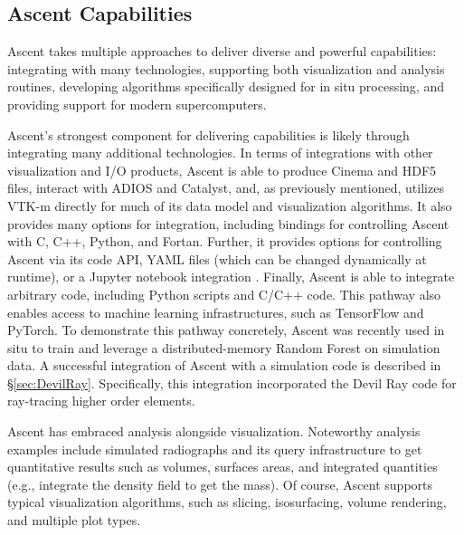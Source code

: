 \documentclass[graybox]{svmult}
\begin{document}
\subsection{Ascent Capabilities}
\label{subsec:capabilities}

Ascent takes multiple approaches to deliver diverse and powerful capabilities:
integrating with many technologies,
supporting both visualization and analysis routines,
developing algorithms specifically designed for in situ processing,
and providing support for modern supercomputers.

Ascent's strongest component for delivering capabilities is likely
through integrating many additional technologies.
%
In terms of integrations with other visualization and I/O products,
Ascent is able to produce Cinema and HDF5 files, interact with
ADIOS and Catalyst, and, as previously mentioned, utilizes VTK-m
directly for much of its data model and visualization algorithms.
%
It also provides many options for integration, including
bindings
for controlling Ascent with  C, C++, Python, and Fortan.
%
Further, it provides options for controlling Ascent via its code API,
YAML files (which can be changed dynamically at runtime), or
a Jupyter notebook integration \cite{CyrusISAV}.
%
Finally, Ascent is able to integrate arbitrary code, including
Python scripts and C/C++ code.
%
This pathway also enables access to
machine learning infrastructures, such as TensorFlow and PyTorch.
%
%
To demonstrate this pathway concretely, Ascent was recently used in situ
to train and leverage a distributed-memory Random Forest on simulation data.
%
%
A successful integration of Ascent with a simulation code is described in \S\ref{sec:DevilRay}.
%
Specifically, this integration incorporated the Devil Ray code for ray-tracing
higher order elements.

Ascent has embraced analysis alongside visualization.
%
Noteworthy analysis examples include simulated radiographs and its
query infrastructure to get quantitative results such as volumes,
surfaces areas, and integrated quantities (e.g., integrate the density field to get the mass).
%
Of course, Ascent supports typical visualization algorithms, such as
slicing, isosurfacing, volume rendering, and multiple plot types.
\end{document}
